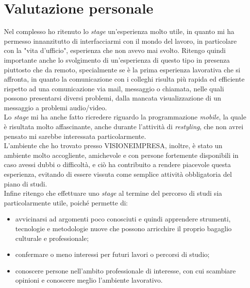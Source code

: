 \section{Valutazione personale}

Nel complesso ho ritenuto lo \textit{stage} un'esperienza molto utile, in quanto mi ha permesso innanzitutto di interfacciarmi con il mondo del lavoro, in particolare con la "vita d'ufficio", esperienza che non avevo mai svolto. Ritengo quindi importante anche lo svolgimento di un'esperienza di questo tipo in presenza piuttosto che da remoto, specialmente se è la prima esperienza lavorativa che si affronta, in quanto la comunicazione con i colleghi risulta più rapida ed efficiente rispetto ad una comunicazione via mail, messaggio o chiamata, nelle quali possono presentarsi diversi problemi, dalla mancata visualizzazione di un messaggio a problemi audio/video.\\
Lo \textit{stage} mi ha anche fatto ricredere riguardo la programmazione \textit{mobile}, la quale è risultata molto affascinante, anche durante l'attività di \emph{restyling}, che non avrei pensato mi sarebbe interessata particolarmente.\\
L'ambiente che ho trovato presso VISIONEIMPRESA, inoltre, è stato un ambiente molto accogliente, amichevole e con persone fortemente disponibili in caso avessi dubbi o difficoltà, e ciò ha contribuito a rendere piacevole questa esperienza, evitando di essere vissuta come semplice attività obbligatoria del piano di studi.\\
Infine ritengo che effettuare uno \textit{stage} al termine del percorso di studi sia particolarmente utile, poiché permette di:
\begin{itemize}
    \item avvicinarsi ad argomenti poco conosciuti e quindi apprendere strumenti, tecnologie e metodologie nuove che possono arricchire il proprio bagaglio culturale e professionale;
    \item confermare o meno interessi per futuri lavori o percorsi di studio;
    \item conoscere persone nell'ambito professionale di interesse, con cui scambiare opinioni e conoscere meglio l'ambiente lavorativo.
\end{itemize}
